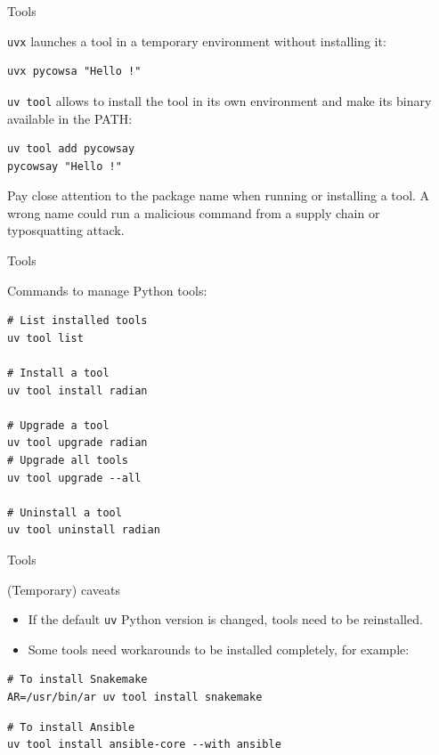 \documentclass[aspectratio=169,xcolor=dvipsnames,svgnames,x11names,fleqn]{beamer}
\begin{document}
\begin{frame}[containsverbatim]{Tools}

    \texttt{uvx} launches a tool in a temporary environment without installing it:
    \begin{verbatim}
uvx pycowsa "Hello !"
    \end{verbatim}

    \bigskip
    \texttt{uv tool} allows to install the tool in its own environment and make its binary available in the PATH:
    \begin{verbatim}
uv tool add pycowsay
pycowsay "Hello !"
    \end{verbatim}

    \begin{talert}{}
    Pay close attention to the package name when running or installing a tool. A wrong name could run a malicious command from a supply chain or typosquatting attack.
    \end{talert}

\end{frame}

\begin{frame}[containsverbatim]{Tools}

    Commands to manage Python tools:
    \begin{verbatim}
# List installed tools
uv tool list

# Install a tool
uv tool install radian

# Upgrade a tool
uv tool upgrade radian
# Upgrade all tools
uv tool upgrade --all

# Uninstall a tool
uv tool uninstall radian
    \end{verbatim}

\end{frame}

\begin{frame}[containsverbatim]{Tools}

    (Temporary) caveats
    \begin{itemize}
        \item If the default \texttt{uv} Python version is changed, tools need to be reinstalled.
        \item Some tools need workarounds to be installed completely, for example:
    \end{itemize}

    \begin{verbatim}
# To install Snakemake
AR=/usr/bin/ar uv tool install snakemake
    \end{verbatim}

    \begin{verbatim}
# To install Ansible
uv tool install ansible-core --with ansible
    \end{verbatim}

\end{frame}
\end{document}
